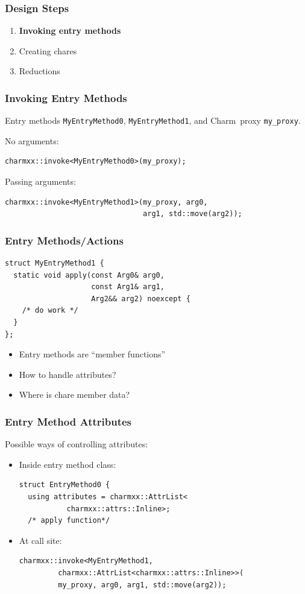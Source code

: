 \documentclass[svgnames,tikz,serif,ragged2e]{beamer}
\newcommand\Charm{Charm\nolinebreak[4]\hspace{-.05em}\raisebox{.4ex}{\relsize{-3}{\textbf{++}}}}
\newcommand{\orgspace}[0]{
  \vspace{0.3cm}
}
\begin{document}
\begin{frame}[noframenumbering]
  \frametitle{Design Steps}
  \begin{enumerate}
  \item \textbf{Invoking entry methods}
  \item Creating chares
  \item Reductions
  \end{enumerate}
\end{frame}

\begin{frame}[fragile]
  \frametitle{Invoking Entry Methods}
  Entry methods \texttt{MyEntryMethod0}, \texttt{MyEntryMethod1}, and
  \Charm~proxy \texttt{my\_proxy}.
  \orgspace{}

No arguments:
\begin{lstlisting}
charmxx::invoke<MyEntryMethod0>(my_proxy);
\end{lstlisting}

\orgspace{}
Passing arguments:
\begin{lstlisting}
charmxx::invoke<MyEntryMethod1>(my_proxy, arg0,
                                arg1, std::move(arg2));
\end{lstlisting}
\end{frame}

\begin{frame}[fragile]
  \frametitle{Entry Methods/Actions}
\begin{lstlisting}
struct MyEntryMethod1 {
  static void apply(const Arg0& arg0,
                    const Arg1& arg1,
                    Arg2&& arg2) noexcept {
    /* do work */
  }
};
\end{lstlisting}

  \begin{itemize}
  \item<1-> Entry methods are ``member functions''
  \item<2-> How to handle attributes?
  \item<3-> Where is chare member data?
  \end{itemize}
\end{frame}

\begin{frame}[fragile]
  \frametitle{Entry Method Attributes}
  Possible ways of controlling attributes:
  \begin{itemize}
  \item Inside entry method class:
\begin{lstlisting}
struct EntryMethod0 {
  using attributes = charmxx::AttrList<
           charmxx::attrs::Inline>;
  /* apply function*/
\end{lstlisting}
  \item At call site:
\begin{lstlisting}
charmxx::invoke<MyEntryMethod1,
         charmxx::AttrList<charmxx::attrs::Inline>>(
         my_proxy, arg0, arg1, std::move(arg2));
\end{lstlisting}
  \end{itemize}
\end{frame}
\end{document}
